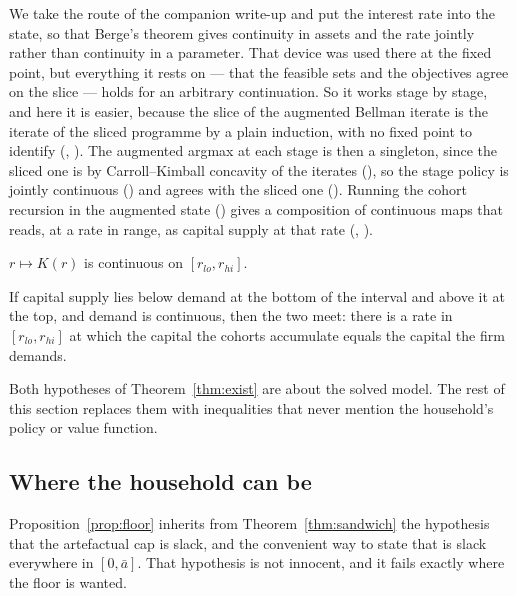 We take the route of the companion write-up and put the interest rate into the state, so that
Berge's theorem gives continuity in assets and the rate jointly rather than continuity in a
parameter. That device was used there at the fixed point, but everything it rests on --- that the
feasible sets and the objectives agree on the slice --- holds for an arbitrary continuation. So
it works stage by stage, and here it is easier, because the slice of the augmented Bellman
iterate is the iterate of the sliced programme by a plain induction, with no fixed point to
identify (, ). The augmented argmax at each
stage is then a singleton, since the sliced one is by Carroll--Kimball concavity of the iterates
(), so the stage policy is jointly continuous
() and agrees with the sliced one
(). Running the cohort recursion in the augmented state
() gives a composition of continuous maps that reads, at a rate in range, as
capital supply at that rate (, ).

\begin{theorem}\label{thm:cont}
$r\mapsto K(r)$ is continuous on $[r_{lo},r_{hi}]$.
\end{theorem}

\begin{theorem}[Existence]\label{thm:exist}
If capital supply lies below demand at the bottom of the interval and above it at the top, and
demand is continuous, then the two meet: there is a rate in $[r_{lo},r_{hi}]$ at which the capital
the cohorts accumulate equals the capital the firm demands.
\end{theorem}

Both hypotheses of Theorem~\ref{thm:exist} are about the solved model. The rest of this section
replaces them with inequalities that never mention the household's policy or value function.

\subsection{Where the household can be}\label{sec:reach}

Proposition~\ref{prop:floor} inherits from Theorem~\ref{thm:sandwich} the hypothesis that the
artefactual cap is slack, and the convenient way to state that is slack everywhere in
$[0,\bar a]$. That hypothesis is not innocent, and it fails exactly where the floor is wanted.

